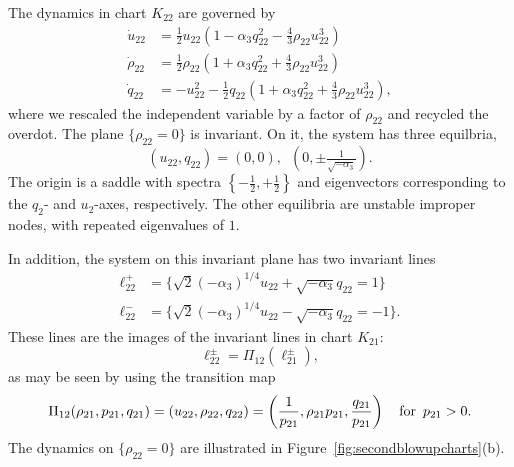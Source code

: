 \documentclass[11pt]{article}
\numberwithin{equation}{section}
\begin{document}
The dynamics in chart $K_{22}$ are governed by
\begin{equation}\label{eq:K22}
    \begin{split}
        \dot{u}_{22} &= \tfrac12 u_{22} \left(
        1 - \alpha_3 q_{22}^2 - \tfrac{4}{3}\rho_{22} u_{22}^3 \right) \\
        \dot{\rho}_{22} &= \tfrac12 \rho_{22} \left( 1 + \alpha_3 q_{22}^2 + \tfrac{4}{3} \rho_{22} u_{22}^3 \right)\\
        \dot{q}_{22} &= -u_{22}^2 - \tfrac12 q_{22} \left( 1 + \alpha_3 q_{22}^2 + \tfrac43  \rho_{22} u_{22}^3
        \right),
    \end{split}
\end{equation}
where we rescaled the independent variable by a factor of $\rho_{22}$ and recycled the overdot.
The plane $\{ \rho_{22}=0 \}$ is invariant.
On it, the system has three equilbria,
\begin{equation*} 
(u_{22},q_{22})= (0,0), \, \, \, (0, \pm \tfrac{1}{\sqrt{-\alpha_3}}).
\end{equation*} 
The origin is a saddle with spectra $\left\{ -\tfrac12, +\tfrac12 \right\}$
and eigenvectors corresponding to the $q_2$- and $u_2$-axes, respectively.
The other equilibria are unstable improper nodes, with repeated eigenvalues of $1$.

In addition, the system on this invariant plane has two invariant lines
\begin{equation}
\begin{split} 
    \ell_{22}^+ &= \{ \sqrt{2}(-\alpha_3)^{1/4} u_{22} + \sqrt{-\alpha_3} q_{22} = 1 \} \\
    \ell_{22}^- &= \{ \sqrt{2}(-\alpha_3)^{1/4} u_{22} - \sqrt{-\alpha_3} q_{22} = -1 \}.
\end{split}
\end{equation}
These lines are the images of the invariant lines in chart $K_{21}$:
\begin{equation*}
    \ell_{22}^\pm = \Pi_{12}(\ell_{21}^\pm),
\end{equation*}
as may be seen by using the transition map 
\begin{equation}\label{eq:Pi12}
\Pi_{12}(\rho_{21},p_{21},q_{21}) = (u_{22},\rho_{22},q_{22}) 
= \left(
\frac{1}{p_{21}}, \rho_{21}p_{21}, \frac{q_{21}}{p_{21}}
\right) \quad {\rm for} \, \, \, p_{21}>0.
\end{equation}
The dynamics on $\{ \rho_{22}=0 \}$ are illustrated in 
Figure~\ref{fig:secondblowupcharts}(b).
\end{document}
